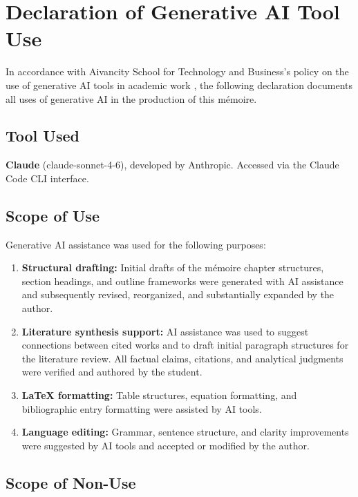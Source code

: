 \chapter{Declaration of Generative AI Tool Use}
\label{app:ai-declaration}

In accordance with Aivancity School for Technology and Business's policy on the use of generative AI tools in academic work \citep{AivancityGuide2025}, the following declaration documents all uses of generative AI in the production of this mémoire.

\section*{Tool Used}

\textbf{Claude} (claude-sonnet-4-6), developed by Anthropic. Accessed via the Claude Code CLI interface.

\section*{Scope of Use}

Generative AI assistance was used for the following purposes:

\begin{enumerate}
  \item \textbf{Structural drafting:} Initial drafts of the mémoire chapter structures, section headings, and outline frameworks were generated with AI assistance and subsequently revised, reorganized, and substantially expanded by the author.
  \item \textbf{Literature synthesis support:} AI assistance was used to suggest connections between cited works and to draft initial paragraph structures for the literature review. All factual claims, citations, and analytical judgments were verified and authored by the student.
  \item \textbf{LaTeX formatting:} Table structures, equation formatting, and bibliographic entry formatting were assisted by AI tools.
  \item \textbf{Language editing:} Grammar, sentence structure, and clarity improvements were suggested by AI tools and accepted or modified by the author.
\end{enumerate}

\section*{Scope of Non-Use}

